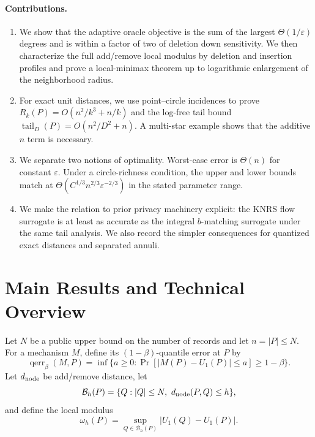 \documentclass[11pt]{article}
\newcommand{\eps}{\varepsilon}
\newcommand{\tail}{\operatorname{tail}}
\begin{document}
\paragraph{Contributions.}
\begin{enumerate}[leftmargin=*]
  \item We show that the adaptive oracle objective is the sum of the largest \(\Theta(1/\eps)\) degrees and is within a factor of two of deletion down sensitivity. We then characterize the full add/remove local modulus by deletion and insertion profiles and prove a local-minimax theorem up to logarithmic enlargement of the neighborhood radius.
  \item For exact unit distances, we use point--circle incidences to prove \(R_k(P)=O(n^2/k^3+n/k)\) and the log-free tail bound \(\tail_D(P)=O(n^2/D^2+n)\). A multi-star example shows that the additive \(n\) term is necessary.
  \item We separate two notions of optimality. Worst-case error is \(\Theta(n)\) for constant \(\eps\). Under a circle-richness condition, the upper and lower bounds match at \(\Theta(C^{1/3}n^{2/3}\eps^{-2/3})\) in the stated parameter range.
  \item We make the relation to prior privacy machinery explicit: the KNRS flow surrogate is at least as accurate as the integral \(b\)-matching surrogate under the same tail analysis. We also record the simpler consequences for quantized exact distances and separated annuli.
\end{enumerate}


\section{Main Results and Technical Overview}
\label{sec:overview}

Let \(N\) be a public upper bound on the number of records and let \(n=|P|\le N\). For a mechanism \(M\), define its \((1-\beta)\)-quantile error at \(P\) by
\[
\operatorname{qerr}_\beta(M,P)=
\inf\{a\ge0:\Pr[|M(P)-U_1(P)|\le a]\ge1-\beta\}.
\]
Let \(d_{\rm node}\) be add/remove distance, let
\[
\mathcal B_h(P)=\{Q:|Q|\le N,\ d_{\rm node}(P,Q)\le h\},
\]
and define the local modulus
\[
\omega_h(P)=\sup_{Q\in\mathcal B_h(P)}|U_1(Q)-U_1(P)|.
\]
\end{document}
